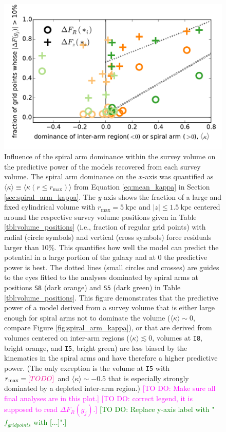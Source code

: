 \documentclass[iop,revtex4,numberedappendix,appendixfloats]{emulateapj}
\newcommand{\Wilma}[1]{\textcolor{Magenta}{#1}}
\newcommand{\HW}[1]{\textcolor{Green}{#1}}
\begin{document}
\begin{figure}[!htbp]
\centering
\includegraphics[width=\columnwidth]{fig/MNdHHdiffSph2_plot_meankappa_vs_frac10grid_2.pdf}
\caption{Influence of the spiral arm dominance within the survey volume on the predictive power of the models recovered from each survey volume. The spiral arm dominance on the $x$-axis was quantified as $\langle \kappa \rangle \equiv \langle \kappa(r\leq r_\text{max})\rangle$ from Equation \eqref{eq:mean_kappa} in Section \ref{sec:spiral_arm_kappa}. The $y$-axis shows the fraction of a large and fixed cylindrical volume with $r_\text{max}=5~\text{kpc}$ and $|z| \leq 1.5~\text{kpc}$ centered around the respective survey volume positions given in Table \ref{tbl:volume_positions} (i.e., fraction of regular grid points) with radial (circle symbols) and vertical (cross symbols) force residuals larger than 10\%.  This quantifies how well the model can predict the potential in a large portion of the galaxy and at $0$ the predictive power is best. The dotted lines (small circles and crosses) are guides to the eyes fitted to the analyses dominated by spiral arms at positions \texttt{S8} (dark orange) and \texttt{S5} (dark green) in Table \ref{tbl:volume_positions}. This figure demonstrates that the predictive power of a model derived from a survey volume that is either large enough for spiral arms not to dominate the volume ($\langle \kappa \rangle \sim 0$, compare Figure \ref{fig:spiral_arm_kappa}), or that are derived from volumes centered on inter-arm regions ($\langle \kappa \rangle \lesssim 0$, volumes at \texttt{I8}, bright orange, and \texttt{I5}, bright green) are less biased by the kinematics in the spiral arms and have therefore a higher predictive power. (The only exception is the volume at \texttt{I5} with $r_\text{max}=\Wilma{[TO DO]}$ and $\langle \kappa \rangle \sim -0.5$ that is especially strongly dominated by a depleted inter-arm region.)  \Wilma{[TO DO: Make sure all final analyses are in this plot.]} \Wilma{[TO DO: correct legend, it is supposed to read $\Delta F_R(g_j)$.]} \HW{[TO DO: Replace y-axis label with "$f_{grid points}$ with [...]".]}}
\label{fig:mean_kappa_vs_frac10_grid}
\end{figure}
\end{document}
